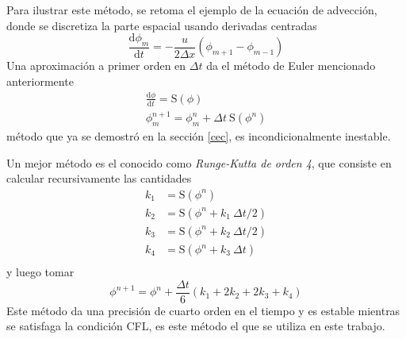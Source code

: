 \documentclass[11pt,twoside,openright,spanish]{report}
\numberwithin{equation}{chapter}
\numberwithin{figure}{chapter}
\numberwithin{table}{chapter}
\begin{document}
Para ilustrar este método, se retoma el ejemplo de la ecuación de advección, donde se discretiza la parte espacial usando derivadas centradas
\begin{equation}
\frac{\text{d}\phi_m}{\text{d}t}=-\frac{u}{2\Delta x}\left(\phi_{m+1}-\phi_{m-1}\right)
\end{equation}
Una aproximación a primer orden en $\Delta t$ da el método de Euler mencionado anteriormente
\begin{eqnarray}
\frac{\text{d}\phi}{\text{d}t}=\mathrm{S}\left(\phi\right)\\
\phi_m^{n+1}=\phi_m^n+\Delta t\ \mathrm{S}\left(\phi^n\right)
\end{eqnarray}
método que ya se demostró en la sección \ref{cec}, es incondicionalmente inestable.

Un mejor método es el conocido como \textit{Runge-Kutta de orden 4}, que consiste en calcular recursivamente las cantidades
\begin{align*}
k_1&=\mathrm{S}\left(\phi^n\right)\\
k_2&=\mathrm{S}\left(\phi^n+k_1\ \Delta t/2\right)\\
k_3&=\mathrm{S}\left(\phi^n+k_2\ \Delta t/2\right)\\
k_4&=\mathrm{S}\left(\phi^n+k_3\ \Delta t\right)\\
\end{align*}
y luego tomar
\begin{equation}
\phi^{n+1}=\phi^n+\frac{\Delta t}{6}\left(k_1+2k_2+2k_3+k_4\right)
\end{equation}
Este método da una precisión de cuarto orden en el tiempo y es estable mientras se satisfaga la condición CFL, es este método el que se utiliza en este trabajo.
\end{document}
